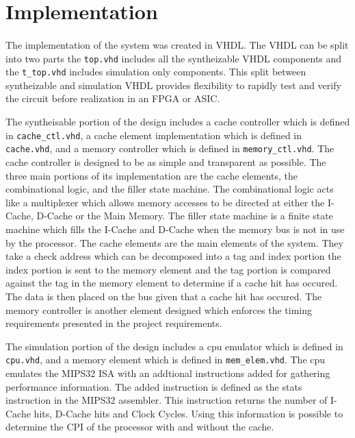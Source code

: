 \documentclass[11pt,letterpaper,final]{article}
\begin{document}
\section{ Implementation }
\paragraph{}
The implementation of the system was created in VHDL.  The VHDL can be split into two parts the \verb|top.vhd| includes all the syntheizable VHDL components and the \verb|t_top.vhd| includes simulation only components.  This split between syntheizable and simulation VHDL provides flexibility to rapidly test and verify the circuit before realization in an FPGA or ASIC. 

The syntheisable portion of the design includes a cache controller which is defined in \verb|cache_ctl.vhd|, a cache element implementation which is defined in \verb|cache.vhd|, and a memory controller which is defined in \verb|memory_ctl.vhd|.  The cache controller is designed to be as simple and transparent as possible.  The three main portions of its implementation are the cache elements, the combinational logic, and the filler state machine.  The combinational logic acts like a multiplexer which allows memory accesses to be directed at either the I-Cache, D-Cache or the Main Memory.  The filler state machine is a finite state machine which fills the I-Cache and D-Cache when the memory bus is not in use by the processor.  The cache elements are the main elements of the system.  They take a check address which can be decomposed into a tag and index portion the index portion is sent to the memory element and the tag portion is compared against the tag in the memory element to determine if a cache hit has occured.  The data is then placed on the bus given that a cache hit has occured.  The memory controller is another element designed which enforces the timing requirements presented in the project requirements.  

The simulation portion of the design includes a cpu emulator which is defined in \verb|cpu.vhd|, and a memory element which is defined in \verb|mem_elem.vhd|.  The cpu emulates the MIPS32 ISA with an addtional instructions added for gathering performance information.  The added instruction is defined as the stats instruction in the MIPS32 assembler.  This instruction returns the number of I-Cache hits, D-Cache hits and Clock Cycles.  Using this information is possible to determine the CPI of the processor with and without the cache.  
\end{document}
